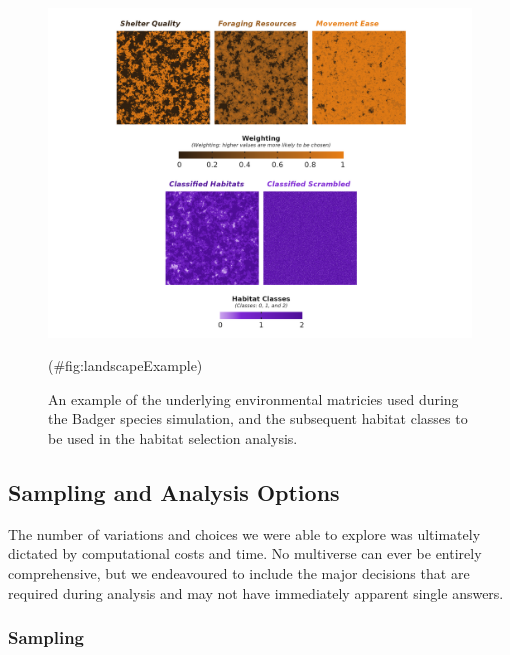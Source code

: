 \documentclass[10pt,a4paper]{article}
\begin{document}
\begin{figure}
\includegraphics[width=1\linewidth]{../figures/landscapeExample} \caption{An example of the underlying environmental matricies used during the Badger species simulation, and the subsequent habitat classes to be used in the habitat selection analysis.}(\#fig:landscapeExample)
\end{figure}

\subsection{Sampling and Analysis Options}\label{sampling-and-analysis-options}

The number of variations and choices we were able to explore was ultimately dictated by computational costs and time.
No multiverse can ever be entirely comprehensive, but we endeavoured to include the major decisions that are required during analysis and may not have immediately apparent single answers.

\subsubsection{Sampling}\label{sampling}
\end{document}
